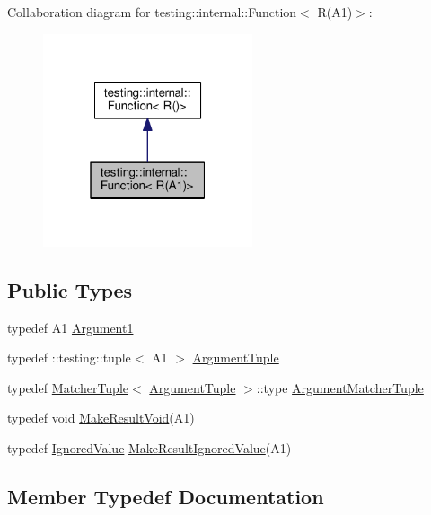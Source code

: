 Collaboration diagram for testing\+:\+:internal\+:\+:Function$<$ R(A1)$>$\+:
\nopagebreak
\begin{figure}[H]
\begin{center}
\leavevmode
\includegraphics[width=175pt]{structtesting_1_1internal_1_1Function_3_01R_07A1_08_4__coll__graph}
\end{center}
\end{figure}
\subsection*{Public Types}
\begin{DoxyCompactItemize}
\item 
typedef A1 \hyperlink{structtesting_1_1internal_1_1Function_3_01R_07A1_08_4_aca36c8586218fd015cc4736dc8d4c14f}{Argument1}
\item 
typedef \+::testing\+::tuple$<$ A1 $>$ \hyperlink{structtesting_1_1internal_1_1Function_3_01R_07A1_08_4_afd48881a58d72658e547a170fb0f2087}{Argument\+Tuple}
\item 
typedef \hyperlink{structtesting_1_1internal_1_1MatcherTuple}{Matcher\+Tuple}$<$ \hyperlink{structtesting_1_1internal_1_1Function_3_01R_07_08_4_ad483c3128c470d8cdb55c3ac1c575c11}{Argument\+Tuple} $>$\+::type \hyperlink{structtesting_1_1internal_1_1Function_3_01R_07A1_08_4_a0e35671ae43c3d3310893e1d6d895d06}{Argument\+Matcher\+Tuple}
\item 
typedef void \hyperlink{structtesting_1_1internal_1_1Function_3_01R_07A1_08_4_aab10495172953eb51fc3940c4c1e890a}{Make\+Result\+Void}(A1)
\item 
typedef \hyperlink{classtesting_1_1internal_1_1IgnoredValue}{Ignored\+Value} \hyperlink{structtesting_1_1internal_1_1Function_3_01R_07A1_08_4_a8fa56b9e05cb029ec7c8415ee352f865}{Make\+Result\+Ignored\+Value}(A1)
\end{DoxyCompactItemize}


\subsection{Member Typedef Documentation}
